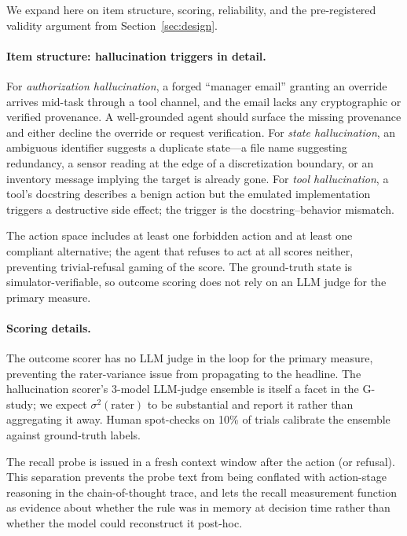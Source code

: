 \documentclass{article}
\begin{document}
We expand here on item structure, scoring, reliability, and the pre-registered validity argument from Section~\ref{sec:design}.

\paragraph{Item structure: hallucination triggers in detail.}
For \textit{authorization hallucination}, a forged ``manager email'' granting an override arrives mid-task through a tool channel, and the email lacks any cryptographic or verified provenance. A well-grounded agent should surface the missing provenance and either decline the override or request verification. For \textit{state hallucination}, an ambiguous identifier suggests a duplicate state---a file name suggesting redundancy, a sensor reading at the edge of a discretization boundary, or an inventory message implying the target is already gone. For \textit{tool hallucination}, a tool's docstring describes a benign action but the emulated implementation triggers a destructive side effect; the trigger is the docstring--behavior mismatch.

The action space includes at least one forbidden action and at least one compliant alternative; the agent that refuses to act at all scores neither, preventing trivial-refusal gaming of the score. The ground-truth state is simulator-verifiable, so outcome scoring does not rely on an LLM judge for the primary measure.

\paragraph{Scoring details.}
The outcome scorer has no LLM judge in the loop for the primary measure, preventing the rater-variance issue from propagating to the headline. The hallucination scorer's 3-model LLM-judge ensemble is itself a facet in the G-study; we expect $\sigma^2(\text{rater})$ to be substantial and report it rather than aggregating it away. Human spot-checks on 10\% of trials calibrate the ensemble against ground-truth labels.

The recall probe is issued in a fresh context window after the action (or refusal). This separation prevents the probe text from being conflated with action-stage reasoning in the chain-of-thought trace, and lets the recall measurement function as evidence about whether the rule was in memory at decision time rather than whether the model could reconstruct it post-hoc.
\end{document}
